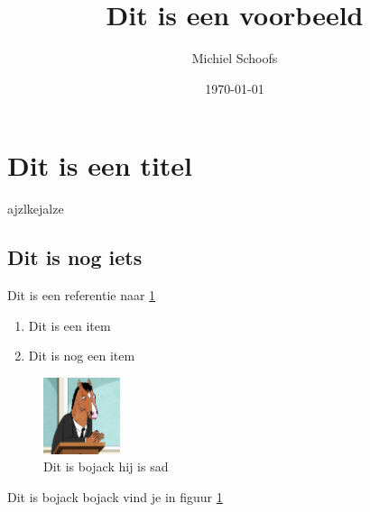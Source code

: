 \documentclass[12pt,twoside,a4paper]{article}
\author{Michiel Schoofs}
\title{Dit is een voorbeeld}
\date{\today}
\begin{document}
\maketitle
\section{Dit is een titel}
\label{sec:intro}
ajzlkejalze
\subsection{Dit is nog iets}

Dit is een referentie naar \ref{sec:intro}
\begin{enumerate}
	\item Dit is een item
	\item Dit is nog een item
\end{enumerate}
\begin{figure}[h]
	\includegraphics[width=0.2\textwidth,height=0.2\textheight]{bojack.jpg}
	\caption{Dit is bojack hij is sad}
	\label{fig:rick}
\end{figure}
Dit is bojack bojack vind je in figuur \ref{fig:rick}
\end{document}
